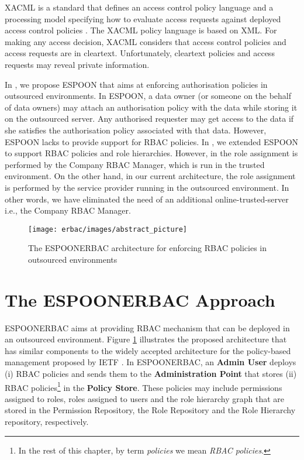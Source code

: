 \documentclass[epsfig,a4paper,11pt,titlepage]{book}
\numberwithin{algorithm}{chapter}
\begin{document}
\gls{XACML} is a standard that defines an access control policy language and a processing model specifying how to evaluate access requests against deployed access control policies \cite{Godik:2002, Yavatkar:2000}. The \gls{XACML} policy language is based on \gls{XML}. For making any access decision, \gls{XACML} considers that access control policies and access requests are in cleartext. Unfortunately, cleartext policies and access requests may reveal private information.

In \cite{Asghar2011-ARES}, we propose \gls{ESPOON} that aims at enforcing authorisation policies in outsourced environments. In \gls{ESPOON}, a data owner (or someone on the behalf of data owners) may attach an authorisation policy with the data while storing it on the outsourced server. Any authorised requester may get access to the data if she satisfies the authorisation policy associated with that data. However, \gls{ESPOON} lacks to provide support for \gls{RBAC} policies. In \cite{Asghar2011-CCS}, we extended \gls{ESPOON} to support \gls{RBAC} policies and role hierarchies. However, in \cite{Asghar2011-CCS} the role assignment is performed by the Company \gls{RBAC} Manager, which is run in the trusted environment. On the other hand, in our current architecture, the role assignment is performed by the service provider running in the outsourced environment. In other words, we have eliminated the need of an additional online-trusted-server i.e., the Company \gls{RBAC} Manager.


\begin{figure} [htp]
\centering
\texttt{[image: erbac/images/abstract\_picture]}
\caption[The proposed architecture for enforcing RBAC policies]{The \gls{ESPOONERBAC} architecture for enforcing RBAC policies in outsourced environments}
\label{fig:erbac-abstract_picture}
\end{figure}

\section[The ESPOON$_{\mathit{ERBAC}}$ Approach]{The \acrshort{ESPOONERBAC} Approach}
\label{sec:erbac-approach}

\gls{ESPOONERBAC} aims at providing \gls{RBAC} mechanism that can be deployed in an outsourced environment. Figure \ref{fig:erbac-abstract_picture} illustrates the proposed architecture that has similar components to the widely accepted architecture for the policy-based management proposed by \gls{IETF} \cite{Yavatkar:2000}. In \gls{ESPOONERBAC}, an \textbf{Admin User} deploys (i) \gls{RBAC} policies and sends them to the \textbf{Administration Point} that stores (ii) \gls{RBAC} policies\footnote{In the rest of this chapter, by term \emph{policies} we mean \emph{\gls{RBAC} policies}.} in the \textbf{Policy Store}. These policies may include permissions assigned to roles, roles assigned to users and the role hierarchy graph that are stored in the Permission Repository, the Role Repository and the Role Hierarchy repository, respectively. 
\end{document}
